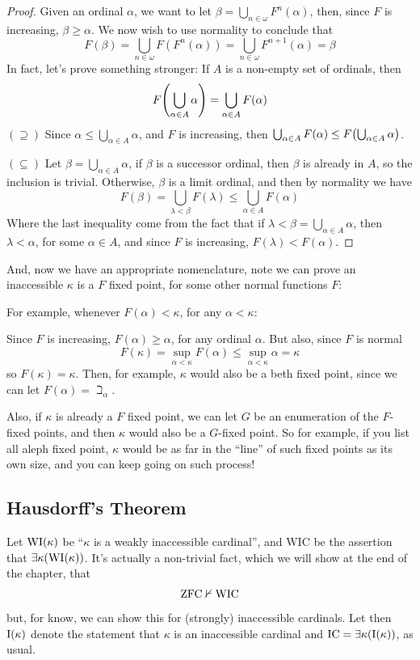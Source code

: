 \begin{proof}
    Given an ordinal $\alpha$, we want to let $\beta=\bigcup_{n\in\omega}F^n(\alpha)$, then, since $F$ is increasing, $\beta\geq\alpha$. We now wish to use normality to conclude that
    $$F(\beta)=\bigcup_{n\in\omega}F(F^n(\alpha))=\bigcup_{n\in\omega}F^{n+1}(\alpha)=\beta$$
    In fact, let's prove something stronger: If $A$ is a non-empty set of ordinals, then
    $$F{\left(\bigcup_{\alpha\in A}\alpha\right)}=\bigcup_{\alpha\in A}F(\alpha)$$
    $(\supseteq)$ Since $\alpha\leq\bigcup_{\alpha\in A}\alpha$, and $F$ is increasing, then $\bigcup_{\alpha\in A}F(\alpha)\leq F{\left(\bigcup_{\alpha\in A}\alpha\right)}$.
    
    $(\subseteq)$ Let $\beta=\bigcup_{\alpha\in A}\alpha$, if $\beta$ is a successor ordinal, then $\beta$ is already in $A$, so the inclusion is trivial. Otherwise, $\beta$ is a limit ordinal, and then by normality we have
    $$F(\beta)=\bigcup_{\lambda<\beta}F(\lambda)\leq \bigcup_{\alpha\in A}F(\alpha)$$
    Where the last inequality come from the fact that if $\lambda<\beta=\bigcup_{\alpha\in A}\alpha$, then $\lambda<\alpha$, for some $\alpha\in A$, and since $F$ is increasing, $F(\lambda)<F(\alpha)$.    
\end{proof}

And, now we have an appropriate nomenclature, note we can prove an inaccessible $\kappa$ is a $F$ fixed point, for some other normal functions $F$:

For example, whenever $F(\alpha)<\kappa$, for any $\alpha<\kappa$:

Since $F$ is increasing, $F(\alpha)\geq\alpha$, for any ordinal $\alpha$. But also, since $F$ is normal
$$F(\kappa)=\sup_{\alpha<\kappa}F(\alpha)\leq \sup_{\alpha<\kappa}\alpha=\kappa$$
so $F(\kappa)=\kappa$. Then, for example, $\kappa$ would also be a beth fixed point, since we can let $F(\alpha)=\beth_\alpha$.

Also, if $\kappa$ is already a $F$ fixed point, we can let $G$ be an enumeration of the $F$-fixed points, and then $\kappa$ would also be a $G$-fixed point. So for example, if you list all aleph fixed point, $\kappa$ would be as far in the ``line'' of such fixed points as its own size, and you can keep going on such process!

\subsection{Hausdorff's Theorem}\label{subsec:hausdorff}

Let $\mathrm{WI}\!\left(\kappa\right)$ be ``$\kappa$ is a weakly inaccessible cardinal'', and $\mathrm{WIC}$ be the assertion that $\exists\kappa(\mathrm{WI}\!\left(\kappa\right))$. It's actually a non-trivial fact, which we will show at the end of the chapter, that
\begin{equation}\label{eq:zfc_wic}
    \mathrm{ZFC}\nvdash\mathrm{WIC}
\end{equation}
but, for know, we can show this for (strongly) inaccessible cardinals. Let then $\mathrm{I}\!\left(\kappa\right)$ denote the statement that $\kappa$ is an inaccessible cardinal and $\mathrm{IC}=\exists\kappa(\mathrm{I}\!\left(\kappa\right))$, as usual.

